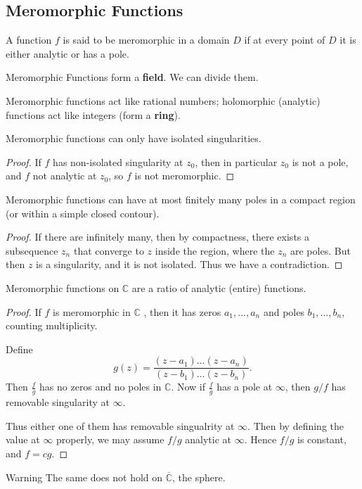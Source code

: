 \subsection{Meromorphic Functions}

\begin{definition}
	A function $f$ is said to be meromorphic in a domain $D$ if at every point of $D$ it is either analytic or has a pole.
\end{definition}

\begin{remark}
	Meromorphic Functions form a \textbf{field}. We can divide them. 

	Meromorphic functions act like rational numbers; holomorphic (analytic) functions act like integers (form a \textbf{ring}).
\end{remark}

\begin{theorem}
	Meromorphic functions can only have isolated singularities.
\end{theorem}
\begin{proof}
	If $f$ has non-isolated singularity at $z_0$, then in particular $z_0$ is not a pole, and $f$ not analytic at $z_0$, so $f$ is not meromorphic.
\end{proof}

\begin{corollary}
	Meromorphic functions can have at most finitely many poles in a compact region (or within a simple closed contour).
\end{corollary}
\begin{proof}
	If there are infinitely many, then by compactness, there exists a subsequence $z_n$ that converge to $z$ inside the region, where the  $z_n$ are poles. But then $z$ is a singularity, and it is not isolated. Thus we have a contradiction.
\end{proof}

\begin{theorem}
	Meromorphic functions on $\mathbb{C}$ are a ratio of analytic (entire) functions.
\end{theorem}
\begin{proof}
	If $f$ is meromorphic in $\mathbb{C}$ , then it has zeros $a_1, \ldots, a_n$ and poles  $b_1, \ldots, b_n$, counting multiplicity.

	Define
	\[
		g(z) = \frac{(z-a_1)\ldots(z-a_n)}{(z-b_1)\ldots(z-b_n)}
	.\] 
	Then $\frac{f}{g}$ has no zeros and no poles in $\mathbb{C}$.
	Now if $\frac{f}{g}$ has a pole at  $\infty $, then $g / f$ has removable singularity at $\infty $.

	Thus either one of them has removable singualrity at $\infty $. Then by defining the value at $\infty $ properly, we may assume $f / g$ analytic at $\infty $. Hence $f / g $ is constant, and $f = cg$.
\end{proof}
\begin{note}{Warning}
	The same does not hold on $\overline{\mathbb{C}} $, the sphere.
\end{note}

